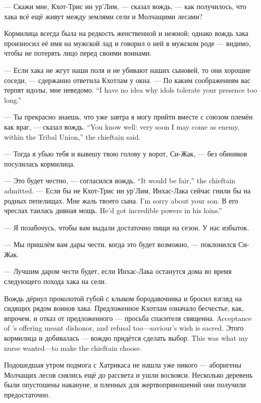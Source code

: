 --- Скажи мне, Кхот-Трис ин ур'Лим, --- сказал вождь, --- как получилось, что хака всё ещё живут между землями сели и Молчащими лесами?

Кормилица всегда была на редкость женственной и нежной;
однако вождь хака произносил её имя на мужской лад и говорил о ней в мужском роде --- видимо, чтобы не потерять лицо перед своими воинами.

--- Если хака не жгут наши поля и не убивают наших сыновей, то они хорошие соседи, --- сдержанно ответила Кхотлам у окна.
{--- По каким соображениям вас терпят идолы, мне неведомо.}
{``I have no idea why idols tolerate your presence too long.''}

{--- Ты прекрасно знаешь, что уже завтра я могу прийти вместе с союзом племён как враг, --- сказал вождь.}
{``You know well: very soon I may come as enemy, within the Tribal Union,'' the chieftain said.}

--- Тогда я убью тебя и вывешу твою голову у ворот, Си-Жак, --- без обиняков посулилась кормилица.

{--- Это будет честно, --- согласился вождь.}
{``It would be fair,'' the chieftain admitted.}
--- Если бы не Кхот-Трис ин ур'Лим, Инхас-Лака сейчас гнили бы на родных пепелищах.
{Мне жаль твоего сына.}
{I'm sorry about your son.}
{В его чреслах таилась дивная мощь.}
{He'd got incredible powers in his loins.''}

--- Я позабочусь, чтобы вам выдали достаточно пищи на сезон.
У нас избыток.

--- Мы пришлём вам дары чести, когда это будет возможно, --- поклонился Си-Жак.

--- Лучшим даром чести будет, если Инхас-Лака останутся дома во время следующего похода хака на сели.

Вождь дёрнул проколотой губой с клыком бородавочника и бросил взгляд на сидящих рядом воинов хака.
{Предложенное Кхотлам означало бесчестье, как, впрочем, и отказ от предложенного --- просьба спасителя священна.}
{Acceptance of \Kchotlam's offering meant dishonor, and refusal too---saviour's wish is sacred.}
{Этого кормилица и добивалась --- вождю придётся сделать выбор.}
{This was what my nurse wanted---to make the chieftain choose.}

\asterism

Подошедшая утром подмога с Хатрикаса не нашла уже никого --- аборигены Молчащих лесов снялись ещё до рассвета и ушли восвояси.
Несколько деревень были опустошены накануне, и пленных для жертвоприношений они получили предостаточно.

